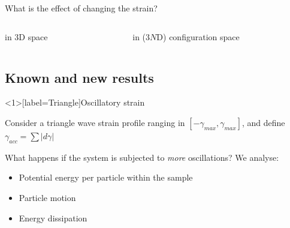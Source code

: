 \documentclass[compress]{beamer}
\newcommand{\abs}[1]{\left| #1 \right|}
\begin{document}
	\begin{frame}{What is the effect of changing the strain?}
		
		\begin{columns}[t]
			\begin{column}{0.5\textwidth}
				\begin{block}{\centering in 3D space}
					\begin{figure}
					\end{figure}
				\end{block}
			\end{column}
			\begin{column}{0.5\textwidth}
				\begin{block}{\centering in ($3N$D) configuration space}
					\begin{figure}
					\end{figure}
				\end{block}
			\end{column}
		\end{columns}

	\end{frame}

	\subsection{Known and new results}

	\begin{frame}[label=Triangle]{Oscillatory strain}
		
		Consider a triangle wave strain profile ranging in $[-\gamma_{max}, \gamma_{max}]$, and define $\gamma_{acc} = \sum{\abs{d\gamma}}$

		\begin{figure}
		\end{figure}
		
		
		\begin{alertblock}{What happens if the system is subjected to \emph{more} oscillations?}
			\onslide<4-> We analyse:
			\begin{itemize}
				\item<4-> \alert<7>{Potential energy per particle within the sample}
				\item<5-> \alert<8>{Particle motion}
				\item<6-> \alert<9>{Energy dissipation}
			\end{itemize}
		\end{alertblock}
		
	\end{frame}
\end{document}

